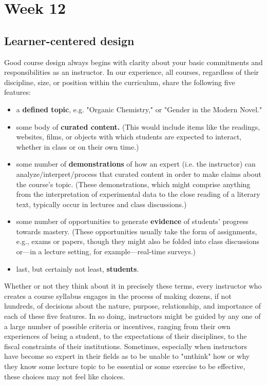 \section{Week 12}
\label{sec:week-12}

\subsection{Learner-centered design}
\label{sec:learn-cent-design}

Good course design always begins with clarity about your basic commitments and responsibilities as an instructor. In our experience, all courses, regardless of their discipline, size, or position within the curriculum, share the following five features:

\begin{itemize}
\item a \textbf{defined topic}, e.g. "Organic Chemistry," or "Gender in the Modern Novel."
  
\item some body of \textbf{curated content.} (This would include items like the readings, websites, films, or objects with which students are expected to interact, whether in class or on their own time.)

  
\item some number of \textbf{demonstrations} of how an expert (i.e. the instructor) can analyze/interpret/process that curated content in order to make claims about the course’s topic. (These demonstrations, which might comprise anything from the interpretation of experimental data to the close reading of a literary text, typically occur in lectures and class discussions.)

  
\item some number of opportunities to generate \textbf{evidence} of students' progress towards mastery. (These opportunities usually take the form of assignments, e.g., exams or papers, though they might also be folded into class discussions or—in a lecture setting, for example—real-time surveys.)
  
\item last, but certainly not least, \textbf{students}.
\end{itemize}
  
Whether or not they think about it in precisely these terms, every instructor who creates a course syllabus engages in the process of making dozens, if not hundreds, of decisions about the nature, purpose, relationship, and importance of each of these five features. In so doing, instructors might be guided by any one of a large number of possible criteria or incentives, ranging from their own experiences of being a student, to the expectations of their disciplines, to the fiscal constraints of their institutions. Sometimes, especially when instructors have become so expert in their fields as to be unable to "unthink" how or why they know some lecture topic to be essential or some exercise to be effective, these choices may not feel like choices.



